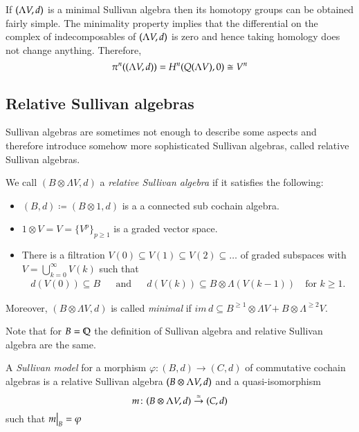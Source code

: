 \begin{Remark}
 If $(\Lambda V,d)$ is a minimal Sullivan algebra then its homotopy groups can be obtained fairly simple. The minimality property
 implies that the differential on the complex of indecomposables of $(\Lambda V,d)$ is zero and hence taking
 homology does not change anything. Therefore, 
 $$ \pi^n ( (\Lambda V,d)) = H^n(Q(\Lambda V),0) \cong V^n$$
\end{Remark}

\subsection{Relative Sullivan algebras}

Sullivan algebras are sometimes not enough to describe some aspects and therefore introduce somehow more sophisticated
Sullivan algebras, called relative Sullivan algebras.

\begin{Definition}
 We call $(B \otimes \Lambda V,d)$ a \emph{relative Sullivan algebra} if it satisfies the following:
 
 \begin{itemize}
  \item $(B,d) \coloneqq (B \otimes 1, d)$ is a a connected sub cochain algebra.
  \item $1 \otimes V = V = { \lbrace V^p \rbrace}_{ p \geq 1}$ is a graded vector space.
  \item There is a filtration $V(0) \subseteq V(1) \subseteq V(2) \subseteq \ldots$ of graded subspaces
    with  $ V = \bigcup_{k = 0}^{\infty} V(k)$ such that 
    \begin{align*}
     d(V(0)) \subseteq B &  & \text{and} & & d(V(k)) \subseteq B \otimes \Lambda (V(k-1)) \quad \text{for $k \geq 1$.}
    \end{align*}
 \end{itemize}
 Moreover, $(B \otimes \Lambda V,d)$ is called \emph{minimal} if 
 $im \, d \subseteq B^{\geq 1} \otimes \Lambda V + B \otimes \Lambda^{\geq 2} V$.
\end{Definition}

\begin{Remark}
 Note that for $B = \mathbb{Q}$ the definition of Sullivan algebra and relative Sullivan algebra are the same.
\end{Remark}

\begin{Definition}

 A \emph{Sullivan model} for a morphism $\varphi \colon (B,d) \to (C,d)$ of commutative cochain algebras is
 a relative Sullivan algebra $(B \otimes \Lambda V,d)$ and a quasi-isomorphism
 $$ m \colon (B \otimes \Lambda V,d) \overset{\simeq}{\to} (C,d) $$
 such that $\restr{m}{B} = \varphi$ 
\end{Definition}

